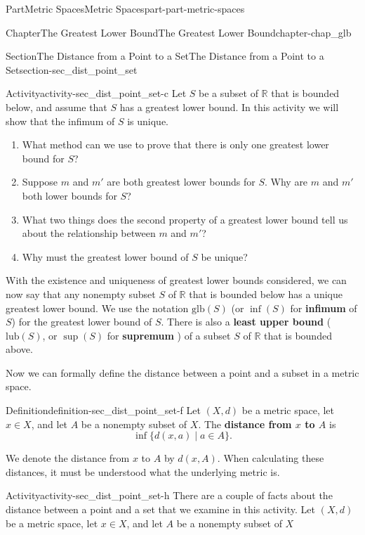 \documentclass[oneside,10pt,]{book}
\newcommand{\terminology}[1]{\textbf{#1}}
\numberwithin{equation}{chapter}
\newcommand{\R}{\mathbb{R}}
\newcommand{\lub}{\text{lub}}
\newcommand{\glb}{\text{glb}}
\begin{document}
\begin{partptx}{Part}{Metric Spaces}{}{Metric Spaces}{}{}{part-part-metric-spaces}
\begin{chapterptx}{Chapter}{The Greatest Lower Bound}{}{The Greatest Lower Bound}{}{}{chapter-chap_glb}
\begin{sectionptx}{Section}{The Distance from a Point to a Set}{}{The Distance from a Point to a Set}{}{}{section-sec_dist_point_set}
\begin{activity}{Activity}{}{activity-sec_dist_point_set-c}%
Let \(S\) be a subset of \(\R\) that is bounded below, and assume that \(S\) has a greatest lower bound. In this activity we will show that the infimum of \(S\) is unique.%
\begin{enumerate}[font=\bfseries,label=(\alph*),ref=\alph*]%
\item{}What method can we use to prove that there is only one greatest lower bound for \(S\)?%
\item{}Suppose \(m\) and \(m'\) are both greatest lower bounds for \(S\). Why are \(m\) and \(m'\) both lower bounds for \(S\)?%
\item{}What two things does the second property of a greatest lower bound tell us about the relationship between \(m\) and \(m'\)?%
\item{}Why must the greatest lower bound of \(S\) be unique?%
\end{enumerate}%
\end{activity}%
With the existence and uniqueness of greatest lower bounds considered, we can now say that any nonempty subset \(S\) of \(\R\) that is bounded below has a unique greatest lower bound. We use the notation \(\glb(S)\) (or \(\inf(S)\) for \terminology{infimum} of \(S\)) for the greatest lower bound of \(S\). There is also a \terminology{least upper bound}  (\(\lub(S)\), or \(\sup(S)\) for \terminology{supremum}  ) of a subset \(S\) of \(\R\) that is bounded above.%
\par
Now we can formally define the distance between a point and a subset in a metric space.%
\begin{definition}{Definition}{}{definition-sec_dist_point_set-f}%
Let \((X,d)\) be a metric space, let \(x \in X\), and let \(A\) be a nonempty subset of \(X\). The \terminology{distance from \(x\) to \(A\)} is%
\begin{equation*}
\inf\{d(x,a) \mid a \in A\}\text{.}
\end{equation*}
%
\end{definition}
We denote the distance from \(x\) to \(A\) by \(d(x,A)\). When calculating these distances, it must be understood what the underlying metric is.%
\begin{activity}{Activity}{}{activity-sec_dist_point_set-h}%
There are a couple of facts about the distance between a point and a set that we examine in this activity. Let \((X,d)\) be a metric space, let \(x \in X\), and let \(A\) be a nonempty subset of \(X\)%

\end{activity}
\end{sectionptx}
\end{chapterptx}
\end{partptx}
\end{document}
